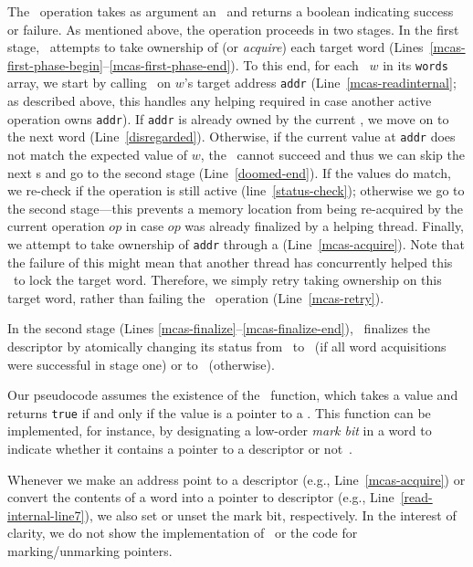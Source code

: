 The \mcas\ operation takes as argument an \mcasdescriptor\ and returns a boolean indicating success or failure. 
As mentioned above, the operation proceeds in two stages. 
In the first stage, \mcas\ attempts to take ownership of (or \textit{acquire}) each target word (Lines~\ref{mcas-first-phase-begin}--\ref{mcas-first-phase-end}).
To this end, for each \worddescriptor\ $w$ in its \texttt{words} array, we start by calling \readInternal\ on $w$'s target address \texttt{addr} 
(Line~\ref{mcas-readinternal}; as described above, this handles any helping required in case another active operation owns \texttt{addr}). 
If \texttt{addr} is already owned by the current \mcas, we move on to the next word (Line~\ref{disregarded}). 
Otherwise, if the current value at \texttt{addr} does not match the expected value of $w$, 
the \mcas\ cannot succeed and thus we can skip the next {\worddescriptor}s and go to the second stage (Line~\ref{doomed-end}). 
If the values do match, we re-check if the operation is still active (line~\ref{status-check}); otherwise we go to the second stage---this prevents a memory location from being re-acquired by the current operation $op$ in case $op$ was already finalized by a helping thread. Finally, we attempt to take ownership of \texttt{addr} through a \cas{} (Line~\ref{mcas-acquire}).
Note that the failure of this \cas{} might mean that another thread has concurrently helped this \mcas\ to lock the target word.
Therefore, we simply retry taking ownership on this target word, rather than failing the \mcas\ operation (Line~\ref{mcas-retry}).

In the second stage (Lines \ref{mcas-finalize}--\ref{mcas-finalize-end}), \mcas\ finalizes the descriptor by atomically changing its status from \ttactive\ to \successful\ (if all word acquisitions were successful in stage one) or to \failed\ (otherwise).

Our pseudocode assumes the existence of the \isDescriptor\ function, which takes a value and returns \texttt{true} if and only if the value is a pointer to a \worddescriptor.  This function can be implemented, for instance, by designating a low-order \emph{mark bit} in a word to indicate whether it contains a pointer to a descriptor or not~\cite{harris02,wang18}. 
\begin{camera}
\end{camera}\begin{arxiv}
Whenever we make an address point to a descriptor (e.g., Line~\ref{mcas-acquire}) or convert the contents of a word into a pointer to descriptor (e.g., Line~\ref{read-internal-line7}), 
we also set or unset the mark bit, respectively. 
In the interest of clarity, we do not show the implementation of \isDescriptor\ or the code for marking/unmarking pointers.
\end{arxiv}

